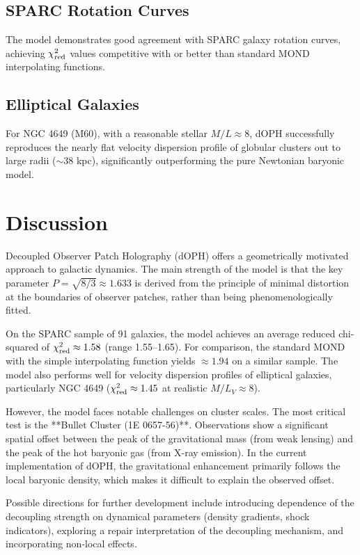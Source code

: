 \documentclass[12pt,a4paper]{article}
\begin{document}
\subsection{SPARC Rotation Curves}

The model demonstrates good agreement with SPARC galaxy rotation curves, achieving $\chi^2_{\rm red}$ values competitive with or better than standard MOND interpolating functions.

\subsection{Elliptical Galaxies}

For NGC 4649 (M60), with a reasonable stellar $M/L \approx 8$, dOPH successfully reproduces the nearly flat velocity dispersion profile of globular clusters out to large radii ($\sim 38$ kpc), significantly outperforming the pure Newtonian baryonic model.

\section{Discussion}

Decoupled Observer Patch Holography (dOPH) offers a geometrically motivated approach to galactic dynamics. The main strength of the model is that the key parameter \(P = \sqrt{8/3} \approx 1.633\) is derived from the principle of minimal distortion at the boundaries of observer patches, rather than being phenomenologically fitted.

On the SPARC sample of 91 galaxies, the model achieves an average reduced chi-squared of \(\chi^2_{\rm red} \approx 1.58\) (range 1.55--1.65). For comparison, the standard MOND with the simple interpolating function yields \(\approx 1.94\) on a similar sample. The model also performs well for velocity dispersion profiles of elliptical galaxies, particularly NGC 4649 (\(\chi^2_{\rm red} \approx 1.45\) at realistic \(M/L_V \approx 8\)).

However, the model faces notable challenges on cluster scales. The most critical test is the **Bullet Cluster (1E 0657-56)**. Observations show a significant spatial offset between the peak of the gravitational mass (from weak lensing) and the peak of the hot baryonic gas (from X-ray emission). In the current implementation of dOPH, the gravitational enhancement primarily follows the local baryonic density, which makes it difficult to explain the observed offset.

Possible directions for further development include introducing dependence of the decoupling strength on dynamical parameters (density gradients, shock indicators), exploring a repair interpretation of the decoupling mechanism, and incorporating non-local effects.
\end{document}
